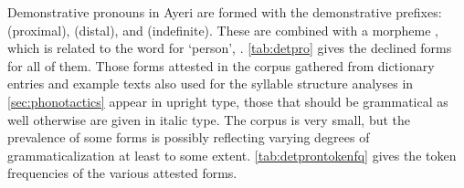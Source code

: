 Demonstrative pronouns in Ayeri are formed with the demonstrative 
prefixes:  (proximal),  
(distal), and  (indefinite). These are combined with a 
morpheme , which is related to the word for `person', 
. \autoref{tab:detpro} gives the declined forms for all of 
them. Those forms attested in the corpus gathered from dictionary entries and 
example texts also used for the syllable structure analyses in 
\autoref{sec:phonotactics} appear in upright type, those that should be 
grammatical as well otherwise are given in italic type. The corpus is very 
small, but the prevalence of some forms is possibly reflecting varying degrees 
of grammaticalization at least to some extent. \autoref{tab:detprontokenfq} 
gives the token frequencies of the various attested forms.

